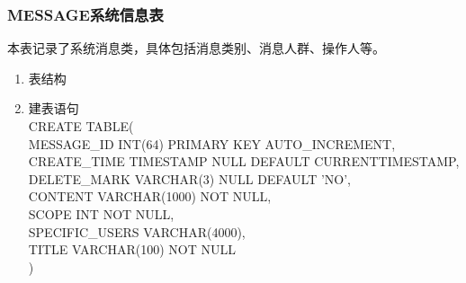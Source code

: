 \subsubsection{MESSAGE系统信息表}
本表记录了系统消息类，具体包括消息类别、消息人群、操作人等。
\begin{enumerate}
    \item 表结构
    \begin{table}[htbp]
        \centering
        \end{table}
    \item 建表语句\\
        CREATE TABLE(\\
            MESSAGE\_ID INT(64) PRIMARY KEY AUTO\_INCREMENT,\\
            CREATE\_TIME TIMESTAMP NULL DEFAULT CURRENTTIMESTAMP,\\
            DELETE\_MARK VARCHAR(3) NULL DEFAULT 'NO',\\
            CONTENT VARCHAR(1000) NOT NULL, \\
            SCOPE INT NOT NULL,\\
            SPECIFIC\_USERS VARCHAR(4000),\\
            TITLE VARCHAR(100) NOT NULL\\
        )
    \end{enumerate}

